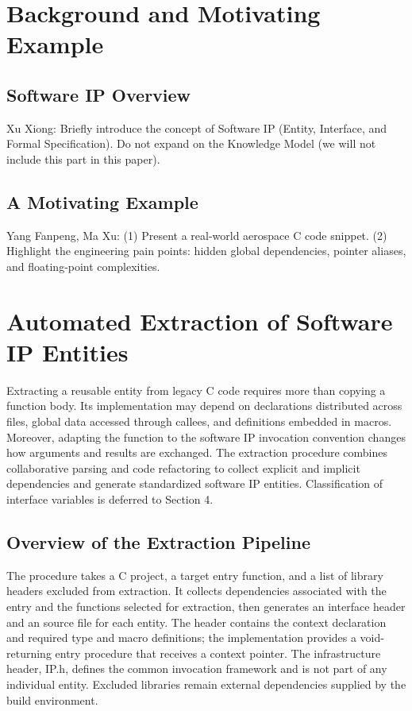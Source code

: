 \documentclass[manuscript, screen, review]{acmart}
\begin{document}
\section{Background and Motivating Example}

\subsection{Software IP Overview}
Xu Xiong: 
Briefly introduce the concept of Software IP (Entity, Interface, and Formal Specification). Do not expand on the Knowledge Model (we will not include this part in this paper).

\subsection{A Motivating Example}
 Yang Fanpeng, Ma Xu:  
(1) Present a real-world aerospace C code snippet.
(2) Highlight the engineering pain points: hidden global dependencies, pointer aliases, and floating-point complexities.

\section{Automated Extraction of Software IP Entities}

Extracting a reusable entity from legacy C code requires more than copying a function body. Its implementation may depend on declarations distributed across files, global data accessed through callees, and definitions embedded in macros. Moreover, adapting the function to the software IP invocation convention changes how arguments and results are exchanged. The extraction procedure combines collaborative parsing and code refactoring to collect explicit and implicit dependencies and generate standardized software IP entities. Classification of interface variables is deferred to Section 4.

\subsection{Overview of the Extraction Pipeline}

The procedure takes a C project, a target entry function, and a list of library headers excluded from extraction. It collects dependencies associated with the entry and the functions selected for extraction, then generates an interface header and an source file for each entity. The header contains the context declaration and required type and macro definitions; the implementation provides a void-returning entry procedure that receives a context pointer. The infrastructure header, IP.h, defines the common invocation framework and is not part of any individual entity. Excluded libraries remain external dependencies supplied by the build environment.
\end{document}
